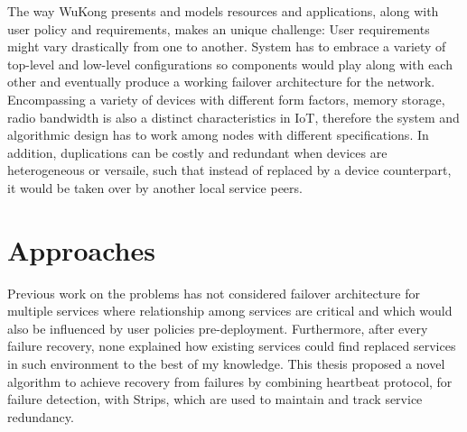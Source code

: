 The way WuKong presents and models resources and applications, along with user
policy and requirements, makes an unique challenge: User requirements might
vary drastically from one to another. System has to embrace a variety of
top-level and low-level configurations so components would play along with each
other and eventually produce a working failover architecture for the network.
Encompassing a variety of devices with different form factors, memory storage,
radio bandwidth is also a distinct characteristics in IoT,
therefore the system and algorithmic design has to work among nodes
with different specifications. In addition, duplications can be
costly and redundant when devices are heterogeneous or versaile,
such that instead of replaced by a device counterpart, it would be
taken over by another local service peers.



\section{Approaches}

Previous work on the problems has not considered failover architecture for
multiple services where relationship among services are critical and which would
also be influenced by user policies pre-deployment. Furthermore, after every
failure recovery, none explained how existing services could find replaced
services in such environment to the best of my knowledge. This thesis proposed
a novel algorithm to achieve recovery from failures by combining heartbeat
protocol, for failure detection, with Strips, which are used to maintain and
track service redundancy. 

